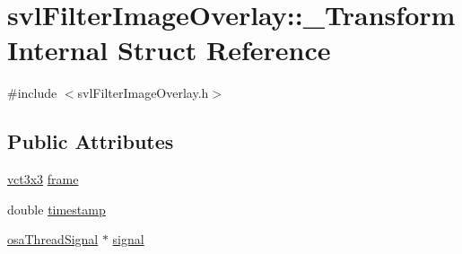 \hypertarget{structsvl_filter_image_overlay_1_1___transform_internal}{\section{svl\-Filter\-Image\-Overlay\-:\-:\-\_\-\-Transform\-Internal Struct Reference}
\label{structsvl_filter_image_overlay_1_1___transform_internal}
}


{\ttfamily \#include $<$svl\-Filter\-Image\-Overlay.\-h$>$}

\subsection*{Public Attributes}
\begin{DoxyCompactItemize}
\item 
\hyperlink{vct_fixed_size_matrix_types_8h_aac4a419dacf9282410675d42ebc86a7c}{vct3x3} \hyperlink{structsvl_filter_image_overlay_1_1___transform_internal_a787852544228904e7cd3dfe152e0c8b5}{frame}
\item 
double \hyperlink{structsvl_filter_image_overlay_1_1___transform_internal_ae2a07acc677c86f82241a0c8594818c4}{timestamp}
\item 
\hyperlink{classosa_thread_signal}{osa\-Thread\-Signal} $\ast$ \hyperlink{structsvl_filter_image_overlay_1_1___transform_internal_a572ad98ec052cca3dc92321d7669c4e6}{signal}
\end{DoxyCompactItemize}


